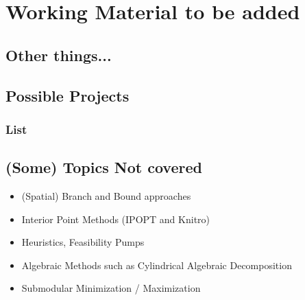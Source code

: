 \documentclass[letter,12pt]{book}
\renewcommand{\0}{\mathbf{0}}
\begin{document}


\part{Working Material to be added}
\chapter{Other things...}








































\chapter{Possible Projects}
\section{List}


\chapter{(Some) Topics Not covered}

\begin{itemize}
\item (Spatial) Branch and Bound approaches
\item Interior Point Methods (IPOPT and Knitro)
\item Heuristics, Feasibility Pumps
\item Algebraic Methods such as Cylindrical Algebraic Decomposition
\item Submodular Minimization / Maximization
\end{itemize}
\ifdefined\partAppendix
\end{document}
